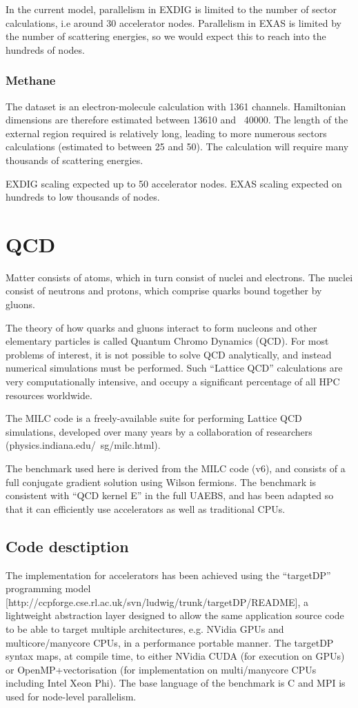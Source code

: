 In the current model, parallelism in EXDIG is limited to the number of sector calculations, i.e around 30 accelerator nodes. Parallelism in EXAS is limited by the number of scattering energies, so we would expect this to reach into the hundreds of nodes.

\subsubsection{Methane}
The dataset is an electron-molecule calculation with 1361 channels. Hamiltonian dimensions are therefore estimated between 13610 and ~40000. The length of the external region required is relatively long, leading to more numerous sectors calculations (estimated to between 25 and 50). The calculation will require many thousands of scattering energies.

EXDIG scaling expected up to 50 accelerator nodes. EXAS scaling expected on hundreds to low thousands of nodes.

\section{QCD}

Matter consists of atoms, which in turn consist of nuclei and electrons. The nuclei consist of neutrons and protons, which comprise quarks bound together by gluons.

The theory of how quarks and gluons interact to form nucleons and other elementary particles is called Quantum Chromo Dynamics (QCD). For most problems of interest, it is not possible to solve QCD analytically, and instead numerical simulations must be performed. Such “Lattice QCD” calculations are very computationally intensive, and occupy a significant percentage of all HPC resources worldwide.

The MILC code is a freely-available suite for performing Lattice QCD simulations, developed over many years by a collaboration of researchers (physics.indiana.edu/~sg/milc.html).

The benchmark used here is derived from the MILC code (v6), and consists of a full conjugate gradient solution using Wilson fermions. The benchmark is consistent with “QCD kernel E” in the full UAEBS, and has been adapted so that it can efficiently use accelerators as well as traditional CPUs.

\subsection{Code desctiption}
The implementation for accelerators has been achieved using the “targetDP” programming model [http://ccpforge.cse.rl.ac.uk/svn/ludwig/trunk/targetDP/README], a lightweight abstraction layer designed to allow the same application source code to be able to target multiple architectures, e.g. NVidia GPUs and multicore/manycore CPUs, in a performance portable manner. The targetDP syntax maps, at compile time, to either NVidia CUDA (for execution on GPUs) or OpenMP+vectorisation (for implementation on multi/manycore CPUs including Intel Xeon Phi). The base language of the benchmark is C and MPI is used for node-level parallelism.

